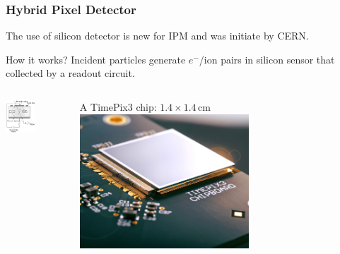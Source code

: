\begin{frame}
  \frametitle{Hybrid Pixel Detector}
  The use of silicon detector is new for IPM and was initiate by CERN.
  \begin{block}{How it works?}
    Incident particles generate $e^{-}$/ion pairs in silicon sensor that collected by a readout circuit.
  \end{block}
  \begin{columns}[T]
    \begin{column}{0.45\textwidth}
      \centering
      \includegraphics[width=0.5\textwidth]{03_SIM/fig/fig000_Si_detector}
    \end{column}
    \begin{column}{0.45\textwidth}
      \centering
      A TimePix3 chip: $1.4\times1.4\,\mathrm{cm}$
      \includegraphics[width=0.6\textwidth]{03_SIM/fig/fig000_TimePix2}
    \end{column}
  \end{columns}


\end{frame}
